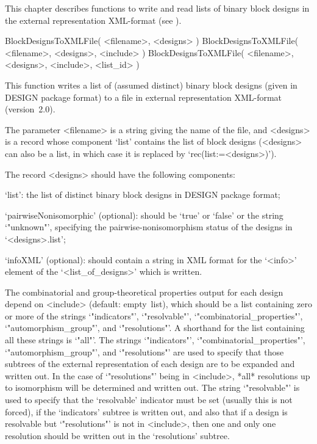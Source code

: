%
%
%
%
\def\DESIGN{\sf DESIGN}
\def\GRAPE{\sf GRAPE}
\def\nauty{\it nauty}
\def\Aut{{\rm Aut}\,}
\def\x{\times}


This chapter describes functions to write and read lists of binary block
designs in the  external representation
XML-format (see \cite{Extrep}).


\>BlockDesignsToXMLFile( <filename>, <designs> )
\>BlockDesignsToXMLFile( <filename>, <designs>, <include> )
\>BlockDesignsToXMLFile( <filename>, <designs>, <include>, <list_id> )

This function writes a list of (assumed distinct) binary block designs
(given in {\DESIGN} package format) to a file in external representation
XML-format (version~2.0).

The parameter <filename> is a string giving the name of the file, and
<designs> is a record whose component `list' contains the list of block
designs (<designs> can also be a list, in which case it is replaced by
`rec(list:=<designs>)').

The record <designs> should have the following components:

`list': the list of distinct binary block designs in {\DESIGN} package
format;

`pairwiseNonisomorphic' (optional): should be `true' or `false' or the
string `"unknown"', specifying the pairwise-nonisomorphism status of the
designs in `<designs>.list';

`infoXML' (optional): should contain a string in XML format for the
`<info>' element of the `<list_of_designs>' which is written.

The combinatorial and group-theoretical properties output for each
design depend on <include> (default: empty~list), which should
be a list containing zero or more of the strings `"indicators"',
`"resolvable"', `"combinatorial_properties"', `"automorphism_group"', and
`"resolutions"'.  A shorthand for the list containing all these strings
is `"all"'.  The strings `"indicators"', `"combinatorial_properties"',
`"automorphism_group"', and `"resolutions"' are used to specify that
those subtrees of the external representation of each design are to
be expanded and written out. In the case of `"resolutions"' being in
<include>, *all* resolutions up to isomorphism will be determined and
written out. The string `"resolvable"' is used to specify that the
`resolvable' indicator must be set (usually this is not forced), if
the `indicators' subtree is written out, and also that if a design is
resolvable but `"resolutions"' is not in <include>, then one and only
one resolution should be written out in the `resolutions' subtree.

